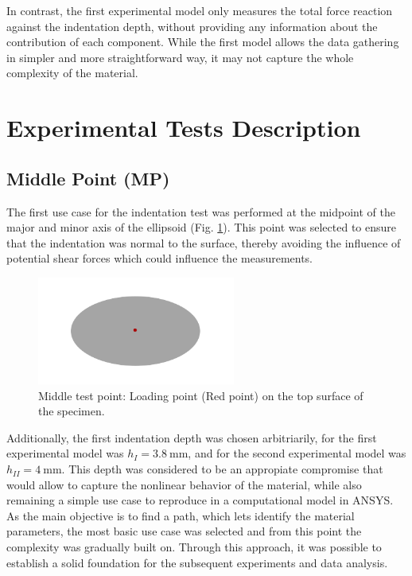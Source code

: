In contrast, the first experimental model only measures the total force reaction 
against the indentation depth, without providing any information about the contribution 
of each component. While the first model allows the data 
gathering in simpler and more straightforward way, it may not capture 
the whole complexity of the material.

\section{Experimental Tests Description}

\subsection*{Middle Point (MP)}
\label{subsection:midpoint}
The first use case for the indentation test was performed at the midpoint 
of the major and minor axis of the ellipsoid (Fig. \ref{fig:midpoint}). This point was selected 
to ensure that the indentation was normal to the surface, thereby avoiding 
the influence of potential shear forces which could influence the 
measurements.

\begin{figure}%
    \centering
   \quad
   \includegraphics[width=6.5cm]{Images/Experiment/specimenmidp.png}%
   \caption[Middle point test position]{Middle test point: Loading point (Red point) on the top surface of the specimen.}%
   \label{fig:midpoint}%
\end{figure}

Additionally, the first indentation depth was chosen arbitriarily, for the first 
experimental model was $h_{I} = \SI{3.8}{\milli \m}$, and for the second 
experimental model was $h_{II} = \SI{4}{\milli \m}$. This depth was considered 
to be an appropiate compromise that would allow to capture the nonlinear 
behavior of the material, while also remaining a simple use case to 
reproduce in a computational model in ANSYS.\\

As the main objective is to find a path, which lets identify the material 
 parameters, the most basic use case was selected and from this point 
the complexity was gradually built on. Through this approach, it was possible 
to establish a solid foundation for the subsequent experiments and data analysis.



